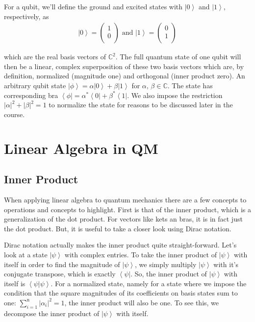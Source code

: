 \documentclass[11pt]{article} %
\newcommand{\bra}[1]{\left\langle #1 \right|}
\newcommand{\ket}[1]{\left|#1\right\rangle}
\newcommand{\braket}[2]{\left\langle#1 |  #2\right\rangle}
\begin{document}
For a qubit, we'll define the ground and excited states with $\ket{0}$ and $\ket{1}$, respectively, as
\begin{align}
    \ket{0} = 
    \begin{pmatrix}
        1 \\
        0 \\
    \end{pmatrix}
    \textrm{ and }
    \ket{1} = 
    \begin{pmatrix}
        0 \\
        1 \\
    \end{pmatrix} \nonumber
\end{align}

\noindent which are the real basis vectors of $\mathbb{C}^2$. The full quantum state of one qubit will then be a linear, complex superposition of these two basis vectors which are, by definition, normalized (magnitude one) and orthogonal (inner product zero). An arbitrary qubit state $\ket{\phi} = \alpha\ket{0} + \beta\ket{1}$ for $\alpha,\,\beta \in \mathbb{C}$. The state has corresponding bra $\bra{\phi} = \alpha^\ast\bra{0} + \beta^\ast\bra{1}$. We also impose the restriction $\left|\alpha\right|^2 + \left|\beta\right|^2 = 1$ to normalize the state for reasons to be discussed later in the course.

\section{Linear Algebra in QM}
\subsection{Inner Product} \label{inner_prod}
When applying linear algebra to quantum mechanics there are a few concepts to operations and concepts to highlight. First is that of the inner product, which is a generalization of the dot product. For vectors like kets an bras, it is in fact just the dot product. But, it is useful to take a closer look using Dirac notation.

Dirac notation actually makes the inner product quite straight-forward. Let's look at a state $\ket{\psi}$ with complex entries. To take the inner product of $\ket{\psi}$ with itself in order to find the magnitude of $\ket{\psi}$, we simply multiply $\ket{\psi}$ with it's conjugate transpose, which is exactly $\bra{\psi}$. So, the inner product of $\ket{\psi}$ with itself is $\braket{\psi}{\psi}$. For a normalized state, namely for a state where we impose the condition that the square magnitudes of its coefficients on basis states sum to one: $\sum^\textrm{n}_{i=1}\left|\alpha_i\right|^2=1$, the inner product will also be one. To see this, we decompose the inner product of $\ket{\psi}$ with itself.
\end{document}
